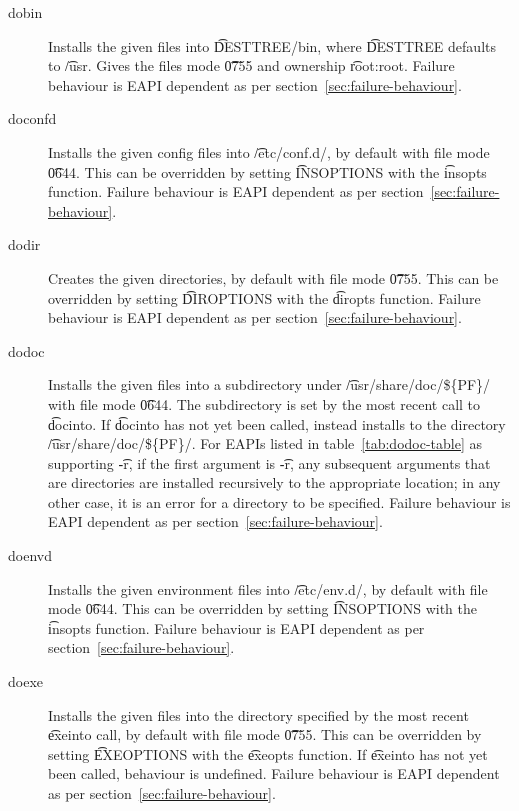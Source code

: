 \begin{description}
\item[dobin] Installs the given files into \t{DESTTREE/bin}, where \t{DESTTREE} defaults to
    \t{/usr}. Gives the files mode \t{0755} and ownership \t{root:root}. Failure behaviour is EAPI
    dependent as per section~\ref{sec:failure-behaviour}.

\item[doconfd] Installs the given config files into \t{/etc/conf.d/}, by default with file mode
    \t{0644}. This can be overridden by setting \t{INSOPTIONS} with the \t{insopts} function.
    Failure behaviour is EAPI dependent as per section~\ref{sec:failure-behaviour}.

\item[dodir] Creates the given directories, by default with file mode \t{0755}. This can be overridden
    by setting \t{DIROPTIONS} with the \t{diropts} function. Failure behaviour is EAPI dependent as
    per section~\ref{sec:failure-behaviour}.

\item[dodoc]  Installs the given files into a subdirectory under
    \t{/usr/share/doc/\$\{PF\}/} with file mode \t{0644}. The subdirectory is set by the most recent
    call to \t{docinto}. If \t{docinto} has not yet been called, instead installs to the directory
    \t{/usr/share/doc/\$\{PF\}/}. For EAPIs listed in table~\ref{tab:dodoc-table} as supporting \t{-r},
    if the first argument is \t{-r}, any subsequent arguments that are directories are installed
    recursively to the appropriate location; in any other case, it is an error for a directory to be
    specified. Failure behaviour is EAPI dependent as per section~\ref{sec:failure-behaviour}.

\item[doenvd] Installs the given environment files into \t{/etc/env.d/}, by default with file mode
    \t{0644}. This can be overridden by setting \t{INSOPTIONS} with the \t{insopts} function.
    Failure behaviour is EAPI dependent as per section~\ref{sec:failure-behaviour}.

\item[doexe] Installs the given files into the directory specified by the most recent \t{exeinto}
    call, by default with file mode \t{0755}. This can be overridden by setting \t{EXEOPTIONS} with
    the \t{exeopts} function. If \t{exeinto} has not yet been called, behaviour is undefined.
    Failure behaviour is EAPI dependent as per section~\ref{sec:failure-behaviour}.


\end{description}
